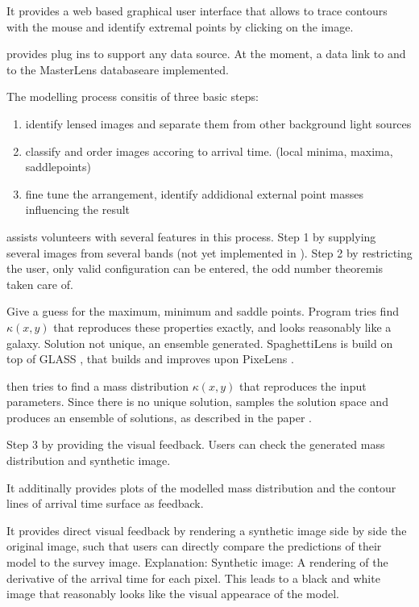 It provides a web based graphical user interface that allows to trace contours with the mouse and identify extremal points by clicking on the image.

\spl provides plug ins to support any data source. At the moment, a data link to \sw and to the MasterLens database\needcite are implemented.

The modelling process consitis of three basic steps:
\begin{enumerate}
  \item identify lensed images and separate them from other background light sources
  \item classify and order images accoring to arrival time. (local minima, maxima, saddlepoints)
  \item fine tune the arrangement, identify addidional external point masses influencing the result
\end{enumerate}

\spl assists volunteers with several features in this process.
Step 1 by supplying several images from several bands (not yet implemented in \sw).
Step 2 by restricting the user, only valid configuration can be entered, the odd number theorem\needcite is taken care of.


Give a guess for the maximum, minimum and saddle points.  Program
tries find $\kappa(x,y)$ that reproduces these properties exactly, and
looks reasonably like a galaxy.  Solution not unique, an ensemble
generated.
SpaghettiLens is build on top of GLASS \citep{Lubini2012}, that builds and improves upon PixeLens \citep{Saha2004}.

\spl then tries to find a mass distribution $\kappa(x,y)$ that reproduces the input parameters.
Since there is no unique solution, \spl samples the solution space and produces an ensemble of solutions, as described in the paper \citep{Lubini2012}.

Step 3 by providing the visual feedback. Users can check the generated mass distribution and synthetic image.

It additinally provides plots of the modelled mass distribution and the contour lines of arrival time surface as feedback. 

It provides direct visual feedback by rendering a synthetic image side
by side the original image, such that users can directly compare the
predictions of their model to the survey image. Explanation: Synthetic
image: A rendering of the derivative of the arrival time for each
pixel. This leads to a black and white image that reasonably looks
like the visual appearace of the model.

